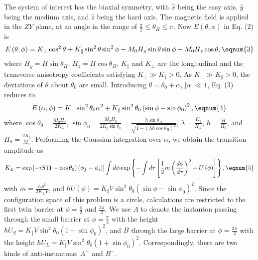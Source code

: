 The system of interest has the biaxial symmetry, with $\widehat{x}$ being
the easy axis, $\widehat{y}$ being the medium axis, and $\widehat{z}$ being
the hard axis. The magnetic field is applied in the $ZY$ plane, at an angle
in the range of $\frac \pi 2\leq \theta _H\leq \pi $. Now $E\left( \theta
,\phi \right) $ in Eq. (2) is 
\begin{equation}
E\left( \theta ,\phi \right) =K_{\bot }\cos ^2\theta +K_{\Vert }\sin
^2\theta \sin ^2\phi -M_0H_y\sin \theta \sin \phi -M_0H_z\cos \theta , 
\eqnum{3}
\end{equation}
where $H_y=H\sin \theta _H$, $H_z=H\cos \theta _H$, $K_{\Vert }$ and $%
K_{\bot }$ are the longitudinal and the transverse anisotropy coefficients
satisfying $K_{\bot }\gg K_{\Vert }>0$. As $K_{\bot }\gg K_{\Vert }>0$, the
deviations of $\theta $ about $\theta _0$ are small. Introducing $\theta
=\theta _0+\alpha $, $\left| \alpha \right| \ll 1$, Eq. (3) reduces to 
\begin{equation}
E\left( \alpha ,\phi \right) =K_{\bot }\sin ^2\theta _0\alpha ^2+K_{\Vert
}\sin ^2\theta _0\left( \sin \phi -\sin \phi _0\right) ^2,  \eqnum{4}
\end{equation}
where $\cos \theta _0=\frac{M_0H_z}{2K_{\bot }}$, $\sin \phi _0=\frac{M_0H_y%
}{2K_{\Vert }\sin \theta _0}=\frac{h\sin \theta _H}{\sqrt{1-\left( \lambda
h\cos \theta _H\right) ^2}}$, $\lambda =\frac{K_{\Vert }}{K_{\bot }}$, $h=%
\frac H{H_0}$, and $H_0=\frac{2K_{\Vert }}{M_0}$. Performing the Gaussian
integration over $\alpha $, we obtain the transition amplitude as 
\begin{equation}
K_E=\exp \left[ -iS\left( 1-\cos \theta _0\right) \left( \phi _f-\phi
_i\right) \right] \int d\phi \exp \left\{ -\int d\tau \left[ \frac 12m\left( 
\frac{d\phi }{d\tau }\right) ^2+U\left( \phi \right) \right] \right\} , 
\eqnum{5}
\end{equation}
with $m=\frac{\hbar S^2}{2K_{\bot }V}$, and $\hbar U\left( \phi \right)
=K_{\Vert }V\sin ^2\theta _0\left( \sin \phi -\sin \phi _0\right) ^2$. Since
the configuration space of this problem is a circle, calculations are
restricted to the first twin barrier at $\phi =\frac \pi 2$ and $\frac{3\pi }%
2$. We use $A$ to denote the instanton passing through the small barrier at $%
\phi =\frac \pi 2$ with the height $\hbar U_S=K_{\Vert }V\sin ^2\theta
_0\left( 1-\sin \phi _0\right) ^2$, and $B$ through the large barrier at $%
\phi =\frac{3\pi }2$ with the height $\hbar U_L=K_{\Vert }V\sin ^2\theta
_0\left( 1+\sin \phi _0\right) ^2$. Correspondingly, there are two kinds of
anti-instantons: $A^{-}$ and $B^{-}$.

